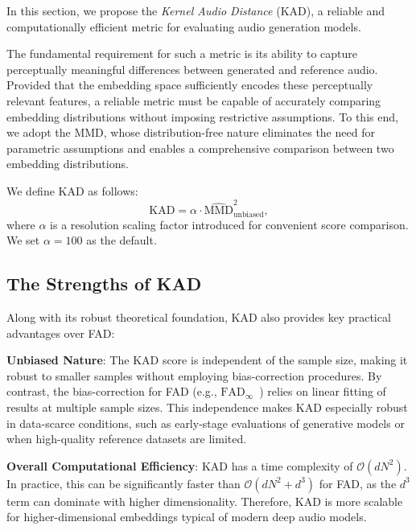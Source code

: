
In this section, we propose the \emph{Kernel Audio Distance} (KAD), a reliable and computationally efficient metric for evaluating audio generation models. 

The fundamental requirement for such a metric is its ability to capture perceptually meaningful differences between generated and reference audio. Provided that the embedding space sufficiently encodes these perceptually relevant features, a reliable metric must be capable of accurately comparing embedding distributions without imposing restrictive assumptions. To this end, we adopt the MMD, whose distribution-free nature eliminates the need for parametric assumptions and enables a comprehensive comparison between two embedding distributions.

We define KAD as follows:
\begin{equation}
    \text{KAD} = \alpha \cdot \widehat{\text{MMD}}^2_{\text{unbiased}},
\end{equation}
where $\alpha$ is a resolution scaling factor introduced for convenient score comparison. We set $\alpha = 100$ as the default.

\subsection{The Strengths of KAD}
Along with its robust theoretical foundation, KAD also provides key practical advantages over FAD:

\textbf{Unbiased Nature}: The KAD score is independent of the sample size, making it robust to smaller samples without employing bias-correction procedures. By contrast, the bias-correction for FAD (e.g., $\text{FAD}_\infty$~\cite{gui2024adapting}) relies on linear fitting of results at multiple sample sizes. This independence makes KAD especially robust in data-scarce conditions, such as early-stage evaluations of generative models or when high-quality reference datasets are limited.

\textbf{Overall Computational Efficiency}: KAD has a time complexity of $\mathcal{O}(dN^2)$. In practice, this can be significantly faster than $\mathcal{O}(dN^2 + d^3)$ for FAD, as the $d^3$ term can dominate with higher dimensionality. Therefore, KAD is more scalable for higher-dimensional embeddings typical of modern deep audio models.

